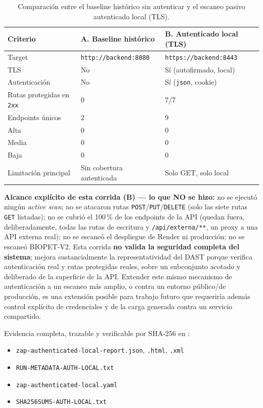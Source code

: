 \begin{table}[H]
  \centering
  \caption{Comparaci\'on entre el baseline hist\'orico sin autenticar y el escaneo pasivo autenticado local (TLS).}
  \label{tab:zap-comparativo}
  \begin{tabular}{@{}lll@{}}
    \toprule
    Criterio & A. Baseline hist\'orico & B. Autenticado local (TLS) \\
    \midrule
    Target & \texttt{http://\allowbreak backend:8080} & \texttt{https://\allowbreak backend:8443} \\
    TLS & No & S\'i (autofirmado, local) \\
    Autenticaci\'on & No & S\'i (\texttt{json}, cookie) \\
    Rutas protegidas en \texttt{2xx} & 0 & 7/7 \\
    Endpoints \'unicos & 2 & 9 \\
    Alta & 0 & 0 \\
    Media & 0 & 0 \\
    Baja & 0 & 0 \\
    Limitaci\'on principal & Sin cobertura autenticada & Solo GET, solo local \\
    \bottomrule
  \end{tabular}
\end{table}

\textbf{Alcance expl\'icito de esta corrida (B) --- lo que NO se hizo:}
no se ejecut\'o ning\'un \emph{active scan}; no se atacaron rutas
\texttt{POST}/\texttt{PUT}/\texttt{DELETE} (solo las siete rutas
\texttt{GET} listadas); no se cubri\'o el 100\,\% de los endpoints de la
API (quedan fuera, deliberadamente, todas las rutas de escritura y
\texttt{/api/externa/**}, un proxy a una API externa real); no se
escane\'o el despliegue de Render ni producci\'on; no se escane\'o
BIOPET-V2. Esta corrida \textbf{no valida la seguridad completa del
sistema}; mejora sustancialmente la representatividad del DAST porque
verifica autenticaci\'on real y rutas protegidas reales, sobre un
subconjunto acotado y deliberado de la superficie de la API. Extender
este mismo mecanismo de autenticaci\'on a un escaneo m\'as amplio, o
contra un entorno p\'ublico/de producci\'on, es una extensi\'on posible
para trabajo futuro que requerir\'ia adem\'as control expl\'icito de
credenciales y de la carga generada contra un servicio compartido.

Evidencia completa, trazable y verificable por SHA-256 en
:

\begin{itemize}[nosep]
  \item \texttt{zap-authenticated-local-report.json}, \texttt{.html}, \texttt{.xml}
  \item \texttt{RUN-METADATA-AUTH-LOCAL.txt}
  \item \texttt{zap-authenticated-local.yaml}
  \item \texttt{SHA256SUMS-AUTH-LOCAL.txt}
\end{itemize}

